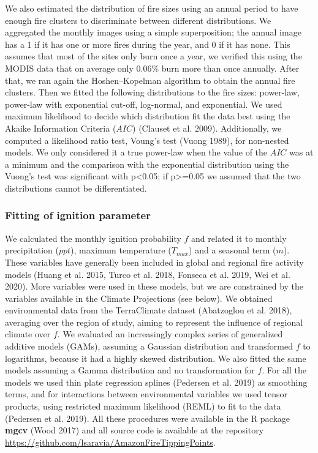 \documentclass[
]{article}
\begin{document}
We also estimated the distribution of fire sizes using an annual period
to have enough fire clusters to discriminate between different
distributions. We aggregated the monthly images using a simple
superposition; the annual image has a 1 if it has one or more fires
during the year, and 0 if it has none. This assumes that most of the
sites only burn once a year, we verified this using the MODIS data that
on average only 0.06\% burn more than once annually. After that, we ran
again the Hoshen--Kopelman algorithm to obtain the annual fire clusters.
Then we fitted the following distributions to the fire sizes: power-law,
power-law with exponential cut-off, log-normal, and exponential. We used
maximum likelihood to decide which distribution fit the data best using
the Akaike Information Criteria (\(AIC\)) (Clauset et al. 2009).
Additionally, we computed a likelihood ratio test, Voung's test (Vuong
1989), for non-nested models. We only considered it a true power-law
when the value of the \(AIC\) was at a minimum and the comparison with
the exponential distribution using the Vuong's test was significant with
p\textless0.05; if p\textgreater=0.05 we assumed that the two
distributions cannot be differentiated.

\subsubsection{Fitting of ignition
parameter}\label{fitting-of-ignition-parameter}

We calculated the monthly ignition probability \(f\) and related it to
monthly precipitation (\(ppt\)), maximum temperature (\(T_{max}\)) and a
seasonal term (\(m\)). These variables have generally been included in
global and regional fire activity models (Huang et al. 2015, Turco et
al. 2018, Fonseca et al. 2019, Wei et al. 2020). More variables were
used in these models, but we are constrained by the variables available
in the Climate Projections (see below). We obtained environmental data
from the TerraClimate dataset (Abatzoglou et al. 2018), averaging over
the region of study, aiming to represent the influence of regional
climate over \(f\). We evaluated an increasingly complex series of
generalized additive models (GAMs), assuming a Gaussian distribution and
transformed \(f\) to logarithms, because it had a highly skewed
distribution. We also fitted the same models assuming a Gamma
distribution and no transformation for \(f\). For all the models we used
thin plate regression splines (Pedersen et al. 2019) as smoothing terms,
and for interactions between environmental variables we used tensor
products, using restricted maximum likelihood (REML) to ﬁt to the data
(Pedersen et al. 2019). All these procedures were available in the R
package \textbf{mgcv} (Wood 2017) and all source code is available at
the repository
\url{https://github.com/lsaravia/AmazonFireTippingPoints}.
\end{document}
